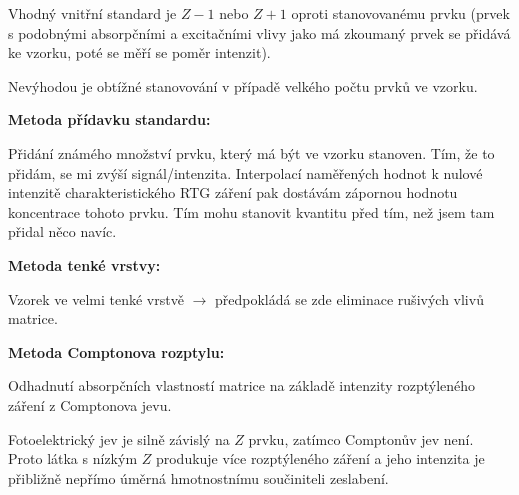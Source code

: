 Vhodný vnitřní standard je $Z-1$ nebo $Z+1$ oproti stanovovanému prvku (prvek s podobnými absorpčními a excitačními vlivy jako má zkoumaný prvek se přidává ke vzorku, poté se měří se poměr intenzit).

Nevýhodou je obtížné stanovování v případě velkého počtu prvků ve vzorku.

\textbf{Metoda přídavku standardu:}

Přidání známého množství prvku, který má být ve vzorku stanoven. Tím, že to přidám, se mi zvýší signál/intenzita. Interpolací naměřených hodnot k nulové intenzitě charakteristického RTG záření pak dostávám zápornou hodnotu koncentrace tohoto prvku. Tím mohu stanovit kvantitu před tím, než jsem tam přidal něco navíc.

\textbf{Metoda tenké vrstvy:}

Vzorek ve velmi tenké vrstvě $\rightarrow$ předpokládá se zde eliminace rušivých vlivů matrice.

\textbf{Metoda Comptonova rozptylu:}

Odhadnutí absorpčních vlastností matrice na základě intenzity rozptýleného záření z Comptonova jevu.

Fotoelektrický jev je silně závislý na $Z$ prvku, zatímco Comptonův jev není. Proto látka s nízkým $Z$ produkuje více rozptýleného záření a jeho intenzita je přibližně nepřímo úměrná hmotnostnímu součiniteli zeslabení.
